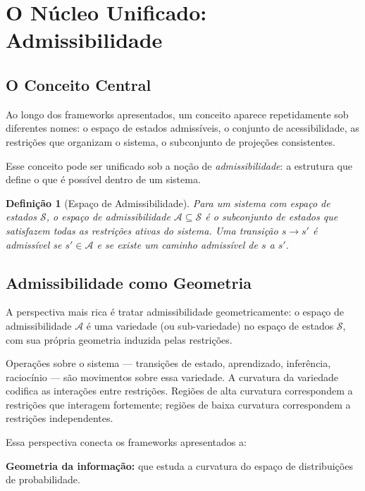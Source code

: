 \documentclass[11pt, a4paper]{article}
\theoremstyle{named}
\newtheorem{definicao}{Definição}
\begin{document}
\section{O Núcleo Unificado: Admissibilidade}

\subsection{O Conceito Central}

Ao longo dos frameworks apresentados, um conceito aparece repetidamente
sob diferentes nomes: o espaço de estados admissíveis, o conjunto de
acessibilidade, as restrições que organizam o sistema, o subconjunto
de projeções consistentes.

Esse conceito pode ser unificado sob a noção de \emph{admissibilidade}:
a estrutura que define o que é possível dentro de um sistema.

\begin{definicao}[Espaço de Admissibilidade]
Para um sistema com espaço de estados $\mathcal{S}$, o espaço de
admissibilidade $\mathcal{A} \subseteq \mathcal{S}$ é o subconjunto
de estados que satisfazem todas as restrições ativas do sistema. Uma
transição $s \to s'$ é admissível se $s' \in \mathcal{A}$ e se
existe um caminho admissível de $s$ a $s'$.
\end{definicao}

\subsection{Admissibilidade como Geometria}

A perspectiva mais rica é tratar admissibilidade geometricamente:
o espaço de admissibilidade $\mathcal{A}$ é uma variedade (ou
sub-variedade) no espaço de estados $\mathcal{S}$, com sua própria
geometria induzida pelas restrições.

Operações sobre o sistema — transições de estado, aprendizado,
inferência, raciocínio — são movimentos sobre essa variedade. A
curvatura da variedade codifica as interações entre restrições. Regiões
de alta curvatura correspondem a restrições que interagem fortemente;
regiões de baixa curvatura correspondem a restrições independentes.

Essa perspectiva conecta os frameworks apresentados a:

\textbf{Geometria da informação:} que estuda a curvatura do espaço de
distribuições de probabilidade.
\end{document}
